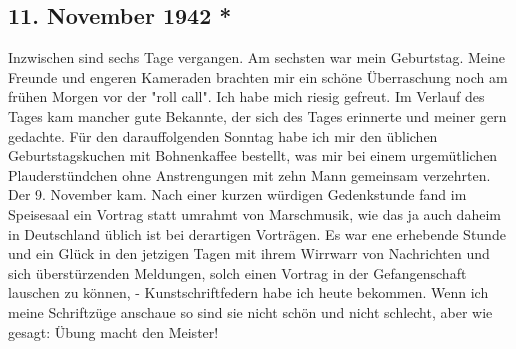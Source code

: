 \subsection{11. November 1942 *}

Inzwischen sind sechs Tage vergangen.
Am sechsten war mein Geburtstag.
Meine Freunde und engeren Kameraden brachten mir ein sch\"{o}ne \"{U}berraschung noch am fr\"{u}hen Morgen vor der "roll call".
Ich habe mich riesig gefreut.
Im Verlauf des Tages kam mancher gute Bekannte, der sich des Tages erinnerte und meiner gern gedachte.
F\"{u}r den darauffolgenden Sonntag habe ich mir den \"{u}blichen Geburtstagskuchen mit Bohnenkaffee bestellt, was mir bei einem urgem\"{u}tlichen Plauderst\"{u}ndchen ohne Anstrengungen mit zehn Mann gemeinsam verzehrten.
Der 9. November kam.
Nach einer kurzen w\"{u}rdigen Gedenkstunde fand im Speisesaal ein Vortrag statt umrahmt von Marschmusik, wie das ja auch daheim in Deutschland \"{u}blich ist bei derartigen Vortr\"{a}gen.
Es war ene erhebende Stunde und ein Gl\"{u}ck in den jetzigen Tagen mit ihrem Wirrwarr von Nachrichten und sich \"{u}berst\"{u}rzenden Meldungen, solch einen Vortrag in der Gefangenschaft lauschen zu k\"{o}nnen, - Kunstschriftfedern habe ich heute bekommen.
Wenn ich meine Schriftz\"{u}ge anschaue so sind sie nicht sch\"{o}n und nicht schlecht, aber wie gesagt: \"{U}bung macht den Meister!


\clearpage
